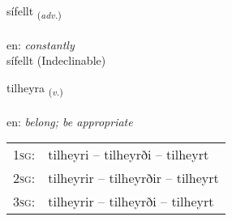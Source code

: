 \documentclass[frontgrid, backgrid]{flacards}\usepackage[]{graphicx}\usepackage[]{color}
\begin{document}

\renewcommand{\flhead}{\vskip5pt \fboxsep=0pt {\small\bfseries\footnotesize Atviksorð | Adverb}}
\renewcommand{\fcfoot}{\vskip5pt \fboxsep=0pt \hspace{2pt}{\small\bfseries\footnotesize 2K}}

\renewcommand{\blhead}{\vskip5pt {\small\bfseries\footnotesize Atviksorð | Adverb }}
\renewcommand{\bcfoot}{\vskip5pt \hspace{2pt}{\small\bfseries\footnotesize 2K}}


{sífellt \small{\textsubscript{(\textit{adv.})}} \\[1ex]
\textphonetic{[siːfɛl̥t]} \\
en: \emph{constantly} \\  [2ex]
sífellt (Indeclinable)}

\renewcommand{\flhead}{\vskip5pt \fboxsep=0pt {\small\bfseries\footnotesize Sagnorð | Verb}}
\renewcommand{\fcfoot}{\vskip5pt \fboxsep=0pt \hspace{2pt}{\small\bfseries\footnotesize 2K}}

\renewcommand{\blhead}{\vskip5pt {\small\bfseries\footnotesize Sagnorð | Verb }}
\renewcommand{\bcfoot}{\vskip5pt \hspace{2pt}{\small\bfseries\footnotesize 2K}}


{tilheyra \small{\textsubscript{(\textit{v.})}} \\[1ex] %
\textphonetic{[tʰɪlheira]} \\
en: \emph{belong; be appropriate} \\  [2ex]
\renewcommand*{\arraystretch}{0.8}
\begin{tabular}{p{1cm}l}
\textsc{1sg}: & tilheyri -- tilheyrði -- tilheyrt \\ 
\textsc{2sg}: & tilheyrir -- tilheyrðir -- tilheyrt \\ 
\textsc{3sg}: & tilheyrir -- tilheyrði -- tilheyrt \\ 
\end{tabular}
}
\end{document}

